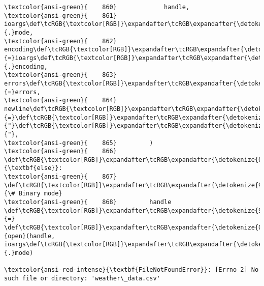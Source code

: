 \documentclass[11pt]{article}
\begin{document}
\begin{Verbatim}[commandchars=\\\{\}, frame=single, framerule=2mm, rulecolor=\color{outerrorbackground}]
\textcolor{ansi-green}{    860}             handle,
\textcolor{ansi-green}{    861}             ioargs\def\tcRGB{\textcolor[RGB]}\expandafter\tcRGB\expandafter{\detokenize{98,98,98}}{.}mode,
\textcolor{ansi-green}{    862}             encoding\def\tcRGB{\textcolor[RGB]}\expandafter\tcRGB\expandafter{\detokenize{98,98,98}}{=}ioargs\def\tcRGB{\textcolor[RGB]}\expandafter\tcRGB\expandafter{\detokenize{98,98,98}}{.}encoding,
\textcolor{ansi-green}{    863}             errors\def\tcRGB{\textcolor[RGB]}\expandafter\tcRGB\expandafter{\detokenize{98,98,98}}{=}errors,
\textcolor{ansi-green}{    864}             newline\def\tcRGB{\textcolor[RGB]}\expandafter\tcRGB\expandafter{\detokenize{98,98,98}}{=}\def\tcRGB{\textcolor[RGB]}\expandafter\tcRGB\expandafter{\detokenize{175,0,0}}{"}\def\tcRGB{\textcolor[RGB]}\expandafter\tcRGB\expandafter{\detokenize{175,0,0}}{"},
\textcolor{ansi-green}{    865}         )
\textcolor{ansi-green}{    866}     \def\tcRGB{\textcolor[RGB]}\expandafter\tcRGB\expandafter{\detokenize{0,135,0}}{\textbf{else}}:
\textcolor{ansi-green}{    867}         \def\tcRGB{\textcolor[RGB]}\expandafter\tcRGB\expandafter{\detokenize{95,135,135}}{\# Binary mode}
\textcolor{ansi-green}{    868}         handle \def\tcRGB{\textcolor[RGB]}\expandafter\tcRGB\expandafter{\detokenize{98,98,98}}{=} \def\tcRGB{\textcolor[RGB]}\expandafter\tcRGB\expandafter{\detokenize{0,135,0}}{open}(handle, ioargs\def\tcRGB{\textcolor[RGB]}\expandafter\tcRGB\expandafter{\detokenize{98,98,98}}{.}mode)

\textcolor{ansi-red-intense}{\textbf{FileNotFoundError}}: [Errno 2] No such file or directory: 'weather\_data.csv'
    \end{Verbatim}
\end{document}
